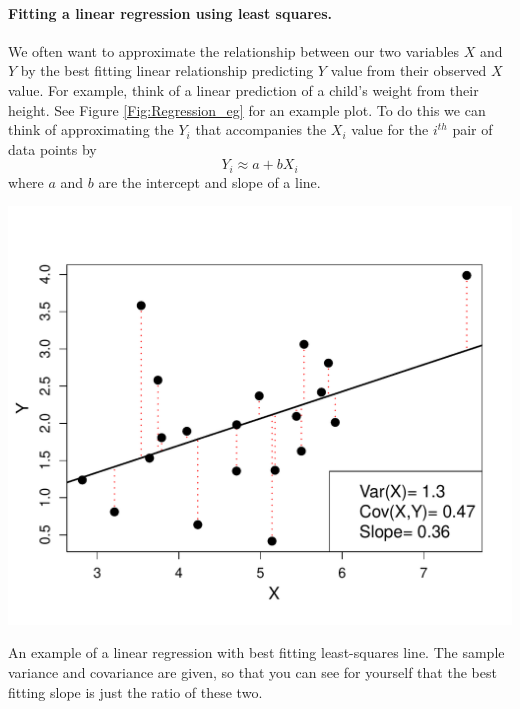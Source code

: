 \paragraph{Fitting a linear regression using least squares.}
We often want to approximate the relationship between our two variables
$X$ and $Y$ by the best fitting linear relationship predicting $Y$
value from their observed $X$
value. For example, think of a linear prediction of a child's weight from their height. 
See Figure \ref{Fig:Regression_eg} for an example plot. To do this we can think of approximating the $Y_i$ that
accompanies the $X_i$ value for the $i^{th}$ pair of data points by
\begin{equation}
Y_i \approx a+ b X_i \label{eqn:def_linear_regression}
\end{equation}
where $a$ and $b$ are the intercept and slope of a line.

 \begin{marginfigure}
 \begin{center}
   \includegraphics[width=\textwidth]{math_background/dist_pics/Linear_regression.pdf}\end{center}
 \caption{An example of a linear regression with best fitting
   least-squares line. The sample variance and covariance are given,
   so that you can see for yourself that the best fitting slope is
   just the ratio of these two. 
   }\label{Fig:Regression_eg}
 \end{marginfigure}


